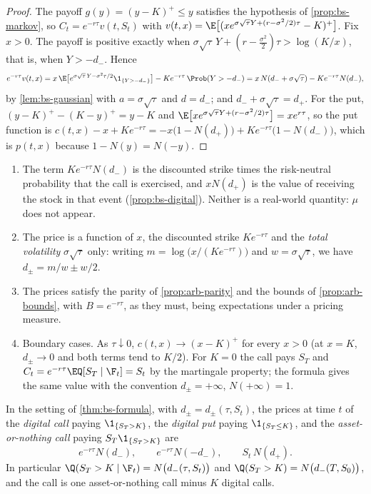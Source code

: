 \begin{proof}
The payoff $g(y)=(y-K)^+\le y$ satisfies the hypothesis of \cref{prop:bs-markov}, so
$C_t=e^{-r\tau}v(t,S_t)$ with
$v(t,x)=\E\big[(xe^{\sigma\sqrt\tau Y+(r-\sigma^2/2)\tau}-K)^+\big]$. Fix $x>0$. The payoff
is positive exactly when $\sigma\sqrt\tau\,Y+(r-\frac{\sigma^2}2)\tau>\log(K/x)$, that is,
when $Y>-d_-$. Hence
\[
  e^{-r\tau}v(t,x)=x\,\E\big[e^{\sigma\sqrt\tau\,Y-\sigma^2\tau/2}\1_{\{Y>-d_-\}}\big]
  -Ke^{-r\tau}\,\Prob(Y>-d_-)=x\,N(d_-+\sigma\sqrt\tau)-Ke^{-r\tau}N(d_-),
\]
by \cref{lem:bs-gaussian} with $a=\sigma\sqrt\tau$ and $d=d_-$; and
$d_-+\sigma\sqrt\tau=d_+$. For the put, $(y-K)^+-(K-y)^+=y-K$ and
$\E\big[xe^{\sigma\sqrt\tau Y+(r-\sigma^2/2)\tau}\big]=xe^{r\tau}$, so the put function is
$c(t,x)-x+Ke^{-r\tau}=-x\big(1-N(d_+)\big)+Ke^{-r\tau}\big(1-N(d_-)\big)$, which is $p(t,x)$
because $1-N(y)=N(-y)$.
\end{proof}

\begin{remark}\label{rem:bs-reading}
\begin{enumerate}[label=(\alph*),leftmargin=*]
  \item The term $Ke^{-r\tau}N(d_-)$ is the discounted strike times the risk-neutral
    probability that the call is exercised, and $xN(d_+)$ is the value of receiving the
    stock in that event (\cref{prop:bs-digital}). Neither is a real-world quantity: $\mu$
    does not appear.
  \item The price is a function of $x$, the discounted strike $Ke^{-r\tau}$ and the
    \emph{total volatility} $\sigma\sqrt\tau$ only: writing $m=\log\big(x/(Ke^{-r\tau})\big)$
    and $w=\sigma\sqrt\tau$, we have $d_\pm=m/w\pm w/2$.
  \item The prices satisfy the parity of \cref{prop:arb-parity} and the bounds of
    \cref{prop:arb-bounds}, with $B=e^{-r\tau}$, as they must, being expectations under a
    pricing measure.
  \item Boundary cases. As $\tau\downarrow0$, $c(t,x)\to(x-K)^+$ for every $x>0$ (at $x=K$,
    $d_\pm\to0$ and both terms tend to $K/2$). For $K=0$ the call pays $S_T$ and
    $C_t=e^{-r\tau}\EQ[S_T\mid\F_t]=S_t$ by the martingale property; the formula gives the
    same value with the convention $d_\pm=+\infty$, $N(+\infty)=1$.
\end{enumerate}
\end{remark}

\begin{proposition}\label{prop:bs-digital}
In the setting of \cref{thm:bs-formula}, with $d_\pm=d_\pm(\tau,S_t)$, the prices at time $t$
of the \emph{digital call} paying $\1_{\{S_T>K\}}$, the \emph{digital put} paying
$\1_{\{S_T\le K\}}$, and the \emph{asset-or-nothing call} paying $S_T\1_{\{S_T>K\}}$ are
\[
  e^{-r\tau}N(d_-),\qquad e^{-r\tau}N(-d_-),\qquad S_t\,N(d_+) .
\]
In particular $\Q(S_T>K\mid\F_t)=N\big(d_-(\tau,S_t)\big)$ and $\Q(S_T>K)=N\big(d_-(T,S_0)\big)$,
and the call is one asset-or-nothing call minus $K$ digital calls.
\end{proposition}

